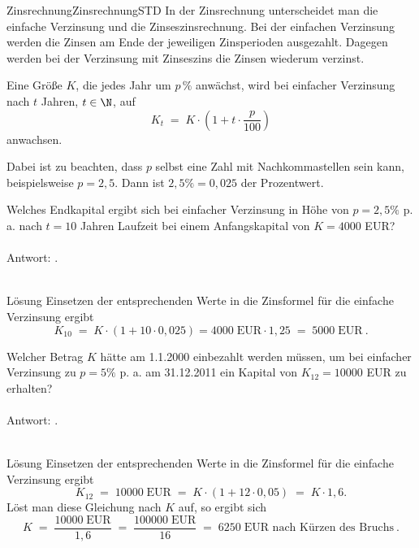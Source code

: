 \begin{MXContent}{Zinsrechnung}{Zinsrechnung}{STD}
In der Zinsrechnung unterscheidet man die einfache Verzinsung und die Zinseszinsrechnung.
Bei der einfachen Verzinsung werden die Zinsen am Ende der jeweiligen Zinsperioden ausgezahlt.
Dagegen werden bei der Verzinsung mit Zinseszins die Zinsen wiederum verzinst.

\begin{MInfo}
Eine Größe $K$, die jedes Jahr um $p\,\%$ anwächst, wird bei einfacher Verzinsung nach $t$ Jahren, $t\in \N$, auf
$$
K_{t}\; =\; K\cdot \left({ 1+ t\cdot \frac{p}{100}}\right)
$$
anwachsen.
\end{MInfo}

Dabei ist zu beachten, dass $p$ selbst eine Zahl mit Nachkommastellen sein kann, beispielsweise $p=2,5$. Dann ist $2,5\%=0,025$ der Prozentwert.

\begin{MExercise}
Welches Endkapital ergibt sich bei einfacher Verzinsung in Höhe von $p=2,5\%$ p. a. nach $t=10$ Jahren Laufzeit bei einem Anfangskapital von $K=4000$ EUR?
\ \\ \ \\
Antwort: .
\ \\ \ \\
\begin{MHint}{Lösung}
Einsetzen der entsprechenden Werte in die Zinsformel für die einfache Verzinsung ergibt
$$
K_{10}\; =\; K\cdot \left({ 1 + 10\cdot 0,025}\right) =4000\; \text{EUR} \cdot 1,25\; =\; 5000\;\text{EUR}\: .
$$
\end{MHint}
\end{MExercise}

\begin{MExercise}
Welcher Betrag $K$ hätte am 1.1.2000 einbezahlt werden müssen, um bei einfacher Verzinsung zu $p=5\%$ p. a. am 31.12.2011 ein Kapital von $K_{12}=10000$ EUR zu erhalten?
\ \\ \ \\
Antwort: .
\ \\ \ \\
\begin{MHint}{Lösung}
Einsetzen der entsprechenden Werte in die Zinsformel für die einfache Verzinsung ergibt
$$
K_{12}\; =\; 10000\;\text{EUR}\;  = \; K\cdot \left({1+12\cdot 0,05}\right)\; =\; K\cdot 1,6.
$$
Löst man diese Gleichung nach $K$ auf, so ergibt sich
$$
K\; =\; \frac{10000\; \text{EUR}}{1,6}\;  =\; \frac{100000\;\text{EUR}}{16}\;=\;  6250\;\text{EUR nach Kürzen des Bruchs}\: .
$$
\end{MHint}
\end{MExercise}


\end{MXContent}
